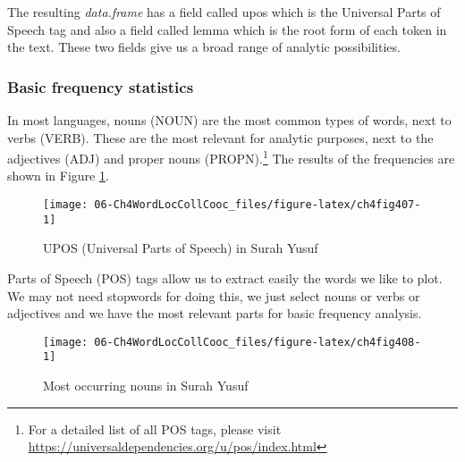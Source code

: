 \documentclass[
]{article}
\newenvironment{Shaded}{\begin{snugshade}}{\end{snugshade}}
\newcommand{\AttributeTok}[1]{\textcolor[rgb]{0.13,0.29,0.53}{#1}}
\newcommand{\DecValTok}[1]{\textcolor[rgb]{0.00,0.00,0.81}{#1}}
\newcommand{\FunctionTok}[1]{\textcolor[rgb]{0.13,0.29,0.53}{\textbf{#1}}}
\newcommand{\NormalTok}[1]{#1}
\newcommand{\OtherTok}[1]{\textcolor[rgb]{0.56,0.35,0.01}{#1}}
\newcommand{\SpecialCharTok}[1]{\textcolor[rgb]{0.81,0.36,0.00}{\textbf{#1}}}
\begin{document}
\begin{Shaded}
\end{Shaded}

\normalsize

The resulting \emph{data.frame} has a field called upos which is the Universal Parts of Speech tag and also a field called lemma which is the root form of each token in the text. These two fields give us a broad range of analytic possibilities.

\hypertarget{basic-frequency-statistics}{%
\subsubsection{Basic frequency statistics}\label{basic-frequency-statistics}}

In most languages, nouns (NOUN) are the most common types of words, next to verbs (VERB). These are the most relevant for analytic purposes, next to the adjectives (ADJ) and proper nouns (PROPN).\footnote{For a detailed list of all POS tags, please visit \url{https://universaldependencies.org/u/pos/index.html}} The results of the frequencies are shown in Figure \ref{fig:ch4fig407}.

\begin{figure}

{\centering \texttt{[image: 06-Ch4WordLocCollCooc\_files/figure-latex/ch4fig407-1]} 

}

\caption{UPOS (Universal Parts of Speech) in Surah Yusuf}\label{fig:ch4fig407}
\end{figure}

Parts of Speech (POS) tags allow us to extract easily the words we like to plot. We may not need stopwords for doing this, we just select nouns or verbs or adjectives and we have the most relevant parts for basic frequency analysis.

\begin{figure}

{\centering \texttt{[image: 06-Ch4WordLocCollCooc\_files/figure-latex/ch4fig408-1]} 

}

\caption{Most occurring nouns in Surah Yusuf}\label{fig:ch4fig408}
\end{figure}
\end{document}
